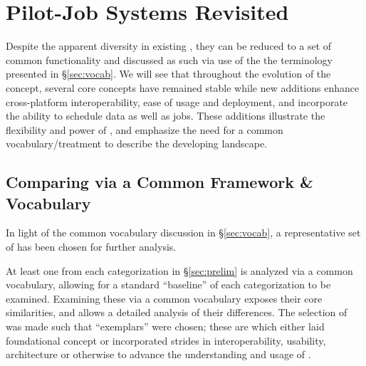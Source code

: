 \documentclass{sig-alternate}
\begin{document}
\section{Pilot-Job Systems Revisited}\label{sec:4}

Despite the apparent diversity in existing \pilotjobs,
they can be reduced to a set of common functionality and
discussed as such via use of the the terminology presented
in \S\ref{sec:vocab}.
We will see that throughout the evolution
of the \pilotjob concept, several core concepts have remained stable
while new additions enhance cross-platform interoperability,
ease of usage and deployment, and incorporate the ability to
schedule data as well as jobs.   These additions illustrate
the flexibility and power of \pilotjobs, and emphasize the
need for a common vocabulary/treatment to describe the
developing landscape.



\subsection{Comparing \pilotjobs via a Common Framework \& Vocabulary}
In light of the common vocabulary discussion in
\S\ref{sec:vocab}, a representative set of \pilotjobs
has been chosen for further analysis.

At least one \pilotjob from each categorization in \S\ref{sec:prelim}
is analyzed via a common vocabulary, allowing for a standard
``baseline'' of each \pilotjob categorization to be examined.
Examining these \pilotjobs via a common vocabulary exposes their core
similarities, and allows a detailed analysis of their differences.
The selection of \pilotjobs was made such that ``exemplars'' were
chosen; these are \pilotjobs which either laid foundational \pilotjob
concept or incorporated strides in interoperability, usability,
architecture or otherwise to advance the understanding and usage of
\pilotjobs.
\end{document}
